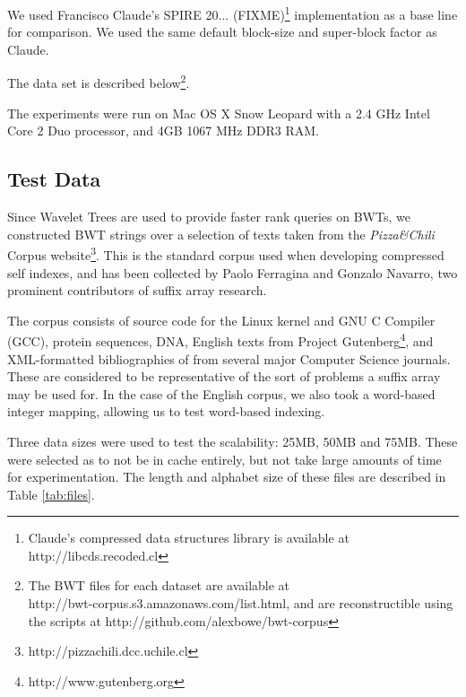 We used Francisco Claude's SPIRE 20... (FIXME)\footnote{Claude's compressed data 
structures library is available at http://libcds.recoded.cl} implementation as a 
base line for comparison. We used the same default block-size and 
super-block factor as Claude.

The data set is described below\footnote{The BWT files for each dataset are 
available at\\ http://bwt-corpus.s3.amazonaws.com/list.html, and are 
reconstructible using the scripts at http://github.com/alexbowe/bwt-corpus}.

The experiments were run on Mac OS X Snow Leopard with a 2.4 GHz Intel Core 2
Duo processor, and 4GB 1067 MHz DDR3 RAM.

\subsection{Test Data}
Since Wavelet Trees are used to provide faster rank queries on BWTs, we
constructed BWT strings over a selection of texts taken from the \emph{Pizza\&Chili}
Corpus website\footnote{http://pizzachili.dcc.uchile.cl}. This is the standard
corpus used when developing compressed self indexes, and has been collected by
Paolo Ferragina and Gonzalo Navarro, two prominent contributors of suffix array 
research.

The corpus consists of source code for the Linux kernel and GNU C Compiler
(GCC), protein sequences, DNA, English texts from Project
Gutenberg\footnote{http://www.gutenberg.org}, and XML-formatted bibliographies
of from several major Computer Science journals. These are considered to be
representative of the sort of problems a suffix array may be used for. In the 
case of the English corpus, we also took a word-based integer mapping, allowing 
us to test word-based indexing.

Three data sizes were used to test the scalability: 25MB, 50MB and 75MB. 
These were selected as to not be in cache entirely, but not take large amounts 
of time for experimentation. The length and alphabet size of these files are 
described in Table \ref{tab:files}.

